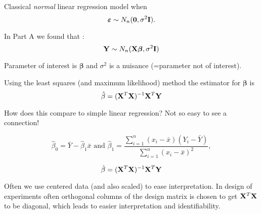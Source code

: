 \documentclass[ignorenonframetext,]{beamer}
\begin{document}
\begin{frame}

Classical \emph{normal} linear regression model when
\[\boldsymbol{\varepsilon}\sim N_n({\bf 0},\sigma^2{\bf I}).\]

In Part A we found that :
\[ {\bf Y} \sim N_{n}({\bf X} {\boldsymbol\beta},\sigma^2 {\bf I})\]

Parameter of interest is \(\boldsymbol{\beta}\) and \(\sigma^2\) is a
nuisance (=parameter not of interest).

Using the least squares (and maximum likelihood) method the estimator
for \(\boldsymbol\beta\) is
\[ \hat\beta=({\bf X}^T{\bf X})^{-1} {\bf X}^T {\bf Y}\]

\end{frame}

\begin{frame}

How does this compare to simple linear regression? Not so easy to see a
connection!

\[\hat{\beta}_0 = \bar{Y}-\hat{\beta}_1 \bar{x} \text{ and } \hat{\beta}_1 = \frac{\sum_{i=1}^n(x_i-\bar{x})(Y_i-\bar{Y})}{\sum_{i=1}^n(x_i-\bar{x})^2},\]

\[ \hat\beta=({\bf X}^T{\bf X})^{-1} {\bf X}^T {\bf Y}\]

Often we use centered data (and also scaled) to ease interpretation. In
design of experiments often orthogonal columns of the design matrix is
chosen to get \({\bf X}^T{\bf X}\) to be diagonal, which leads to easier
interpretation and identifiability.

\end{frame}
\end{document}

